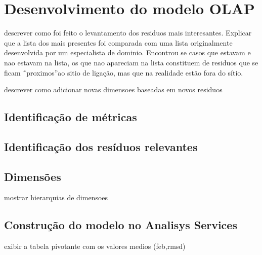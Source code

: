\chapter{Desenvolvimento do modelo OLAP}

descrever como foi feito o levantamento dos residuos mais interesantes. Explicar que a lista dos mais presentes foi comparada com uma lista originalmente desenvolvida por um especialista de dominio. Encontrou se casos que estavam e nao estavam na lista, os que nao apareciam na lista constituem de residuos que se ficam ˜proximos”ao sitio de ligação, mas que na realidade estão fora do sítio.

descrever como  adicionar novas dimensoes baseadas em novos residuos

\section{Identificação de métricas}

\section{Identificação dos resíduos relevantes}

\section{Dimensões}
	mostrar hierarquias de dimensoes
	
\section{Construção do modelo no Analisys Services}
	exibir a tabela pivotante com os valores medios (feb,rmsd)
